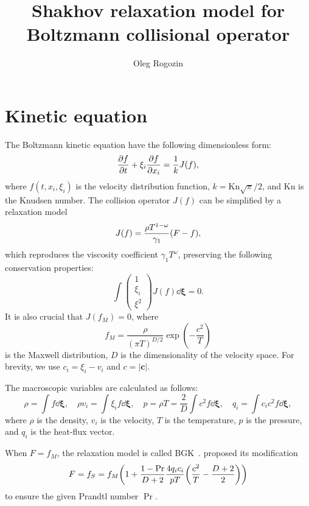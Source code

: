 \documentclass{article}
\title{Shakhov relaxation model for Boltzmann collisional operator}
\author{Oleg Rogozin}
\newcommand{\Kn}{\mathrm{Kn}}
\newcommand{\bxi}{\boldsymbol{\xi}}
\begin{document}
\maketitle
\tableofcontents

\section{Kinetic equation}

The Boltzmann kinetic equation have the following dimensionless form:
\begin{equation}\label{eq:Boltzmann}
    \pdv{f}{t} + \xi_i\pdv{f}{x_i} = \frac1kJ(f),
\end{equation}
where $f(t,x_i,\xi_i)$ is the velocity distribution function, $k=\Kn\sqrt\pi/2$,
and $\Kn$ is the Knudsen number.
The collision operator $J(f)$ can be simplified by a relaxation model
\begin{equation}\label{eq:model}
    J(f) = \frac{\rho T^{1-\omega}}{\gamma_1}\qty(F - f),
\end{equation}
which reproduces the viscosity coefficient $\gamma_1T^\omega$,
preserving the following conservation properties:
\begin{equation}\label{eq:F}
    \int \begin{pmatrix} 1 \\ \xi_i \\ \xi^2 \end{pmatrix} J(f)\dd\bxi = 0.
\end{equation}
It is also crucial that $J(f_M) = 0$, where
\begin{equation}\label{eq:Maxwell}
    f_M = \frac{\rho}{(\pi T)^{D/2}}\exp(-\frac{c^2}T)
\end{equation}
is the Maxwell distribution, $D$ is the dimensionality of the velocity space.
For brevity, we use \(c_i = \xi_i - v_i\) and \(c = |\boldsymbol{c}|\).

The macroscopic variables are calculated as follows:
\begin{equation}\label{eq:macro}
    \rho = \int f \dd\bxi, \quad
    \rho v_i = \int \xi_i f \dd\bxi, \quad
    p = \rho T = \frac2D\int c^2 f \dd\bxi, \quad
    q_i = \int c_i c^2 f \dd\bxi,
\end{equation}
where \(\rho\) is the density, \(v_i\) is the velocity, \(T\) is the temperature,
\(p\) is the pressure, and \(q_i\) is the heat-flux vector.

When $F=f_M$, the relaxation model is called BGK~\cite{bhatnagar1954model}.
\textcite{shakhov1968generalization} proposed its modification
\begin{equation}\label{eq:Shakhov}
    F = f_S = f_M\qty(1 + \frac{1-\Pr}{D+2}\frac{4q_ic_i}{pT}\qty(\frac{c^2}{T} - \frac{D+2}2))
\end{equation}
to ensure the given Prandtl number $\Pr$.
\end{document}
